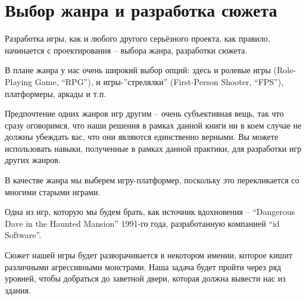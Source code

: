 \documentclass[../sparc.tex]{subfiles}
\begin{document}
\section{Выбор жанра и разработка сюжета}

Разработка игры, как и любого другого серьёзного проекта, как правило,
начинается с проектирования -- выбора жанра, разработки сюжета.

В плане жанра у нас очень широкий выбор опций: здесь и ролевые игры
(Role-Playing Game, ``RPG''), и игры-''стрелялки'' (First-Person Shooter,
``FPS''), платформеры, аркады и т.п.

Предпочтение одних жанров игр другим -- очень субъективная вещь, так что сразу
оговоримся, что наши решения в рамках данной книги ни в коем случае не должны
убеждать вас, что они являются единственно верными.  Вы можете использовать
навыки, полученные в рамках данной практики, для разработки игр других жанров.

В качестве жанра мы выберем игру-платформер, поскольку это перекликается со
многими старыми играми.

Одна из игр, которую мы будем брать, как источник вдохновения -- ``Dangerous
Dave in the Haunted Mansion'' 1991-го года, разработанную компанией ``id
Software''.

Сюжет нашей игры будет разворачивается в некотором имении, которое кишит
различными агрессивными монстрами.  Наша задача будет пройти через ряд уровней,
чтобы добраться до заветной двери, которая должна вывести нас из здания.
\end{document}
